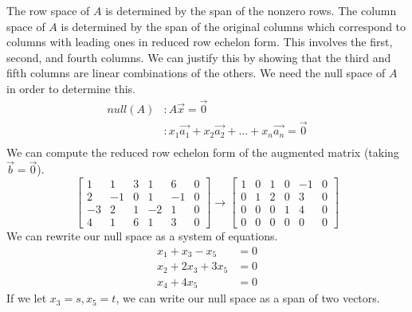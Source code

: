 \documentclass{math}
\begin{document}
The row space of \( A \) is determined by the span of the nonzero rows. The
column space of \( A \) is determined by the span of the original columns which
correspond to columns with leading ones in reduced row echelon form. This
involves the first, second, and fourth columns. We can justify this by showing
that the third and fifth columns are linear combinations of the others. We need
the null space of \( A \) in order to determine this.
\begin{align*}
  null(A) &: A\vec{x} = \vec{0} \\
  &: x_1\vec{a_1}+x_2\vec{a_2}+\dots+x_n\vec{a_n} = \vec{0} \\
\end{align*}
We can compute the reduced row echelon form of the augmented matrix (taking
\( \vec{b} = \vec{0} \)).
\[ \begin{bmatrix}
  1 & 1 & 3 & 1 & 6 & 0 \\
  2 & -1 & 0 & 1 & -1 & 0 \\
  -3 & 2 & 1 & -2 & 1 & 0 \\
  4 & 1 & 6 & 1 & 3 & 0
\end{bmatrix} \to \begin{bmatrix}
  1 & 0 & 1 & 0 & -1 & 0 \\
  0 & 1 & 2 & 0 & 3 & 0 \\
  0 & 0 & 0 & 1 & 4 & 0 \\
  0 & 0 & 0 & 0 & 0 & 0
\end{bmatrix} \]
We can rewrite our null space as a system of equations.
\begin{align*}
  x_1+x_3-x_5 &= 0 \\
  x_2+2x_3+3x_5 &= 0 \\
  x_4+4x_5 &= 0
\end{align*}
If we let \( x_3 = s, x_5 = t \), we can write our null space as a span of
two vectors.
\end{document}
